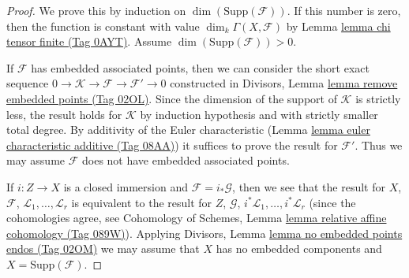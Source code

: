 \documentclass{amsart}
\theoremstyle{plain}
\theoremstyle{definition}
\theoremstyle{remark}
\numberwithin{equation}{subsection}
\begin{document}
\begin{proof}
We prove this by induction on $\dim(\text{Supp}(\mathcal{F}))$.
If this number is zero, then the function is constant with value
$\dim_k \Gamma(X, \mathcal{F})$ by Lemma \href{https://stacks.math.columbia.edu/tag/0AYT}{lemma chi tensor finite (Tag 0AYT)}.
Assume $\dim(\text{Supp}(\mathcal{F})) > 0$.

\medskip\noindent
If $\mathcal{F}$ has embedded associated points, then we can consider
the short exact sequence
$0 \to \mathcal{K} \to \mathcal{F} \to \mathcal{F}' \to 0$
constructed in Divisors, Lemma \href{https://stacks.math.columbia.edu/tag/02OL}{lemma remove embedded points (Tag 02OL)}.
Since the dimension of the support of $\mathcal{K}$ is strictly less,
the result holds for $\mathcal{K}$ by induction hypothesis and with
strictly smaller total degree.
By additivity of the Euler characteristic
(Lemma \href{https://stacks.math.columbia.edu/tag/08AA}{lemma euler characteristic additive (Tag 08AA)})
it suffices to prove the result for $\mathcal{F}'$. Thus we may assume
$\mathcal{F}$ does not have embedded associated points.

\medskip\noindent
If $i : Z \to X$ is a closed immersion and $\mathcal{F} = i_*\mathcal{G}$,
then we see that the result for $X$, $\mathcal{F}$,
$\mathcal{L}_1, \ldots, \mathcal{L}_r$ is equivalent to the result
for $Z$, $\mathcal{G}$, $i^*\mathcal{L}_1, \ldots, i^*\mathcal{L}_r$
(since the cohomologies agree, see
Cohomology of Schemes, Lemma \href{https://stacks.math.columbia.edu/tag/089W}{lemma relative affine cohomology (Tag 089W)}).
Applying Divisors, Lemma \href{https://stacks.math.columbia.edu/tag/02OM}{lemma no embedded points endos (Tag 02OM)}
we may assume that $X$ has no embedded components and
$X = \text{Supp}(\mathcal{F})$.


\end{proof}
\end{document}
